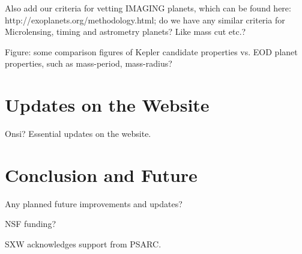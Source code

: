 \documentclass[11pt,preprint]{aastex}
\begin{document}
\begin{CJK*}{UTF8}{gbsn}
Also add our criteria for vetting IMAGING planets, which can be found
here: http://exoplanets.org/methodology.html; do we have any similar
criteria for Microlensing, timing and astrometry planets? Like mass
cut etc.?

Figure: some comparison figures of Kepler candidate properties
vs. EOD planet properties, such as mass-period, mass-radius?


\section{Updates on the Website}

Onsi? Essential updates on the website.


\section{Conclusion and Future}\label{sec:conclusion}

Any planned future improvements and updates?


\acknowledgments

NSF funding?

SXW acknowledges support from PSARC.





\clearpage


\end{CJK*}
\end{document}
